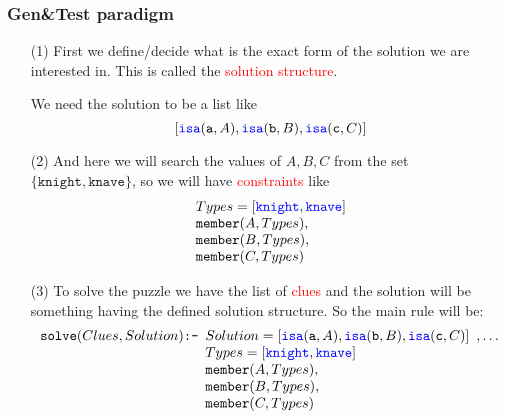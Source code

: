 \documentclass[xcolor=x11names]{beamer}
\newcommand{\cemph}[1]{\textcolor{red}{#1}}
\newcommand\ol[1]{\textcolor{blue}{\texttt{#1}}}
\newcommand{\lista}[1]{\left[#1\right]}
\newcommand{\knight}{\texttt{knight}}
\newcommand{\knave}{\texttt{knave}}
\newcommand{\member}{\texttt{member}}
\newcommand{\atom}[1]{\texttt{#1}}
\newcommand{\szabaly}[2]{#1\texttt{:-}#2}
\begin{document}
\begin{frame}
  \frametitle{Gen\&Test paradigm}
    \begin{itemize}
        \item[(1)] First we define/decide what is the exact form of the solution we are interested in. This is called the \cemph{solution structure}.

            We need the solution to be a list like
            \[ \lista{\ol{isa}(\atom a,A), \ol{isa}(\atom b,B), \ol{isa}(\atom c,C)} \]
        \item[(2)]  And here we will search the values of $A,B,C$ from the set $\{\knight, \knave\}$, so we will have \cemph{constraints} like
        \[ \begin{array}{l}
            Types = \lista{\ol{knight}, \ol{knave}}
            \\ \member(A,Types),
            \\ \member(B,Types),
            \\ \member(C,Types)
        \end{array}\]
        \item[(3)] To solve the puzzle we have the list of \cemph{clues} and the solution will be something having the defined solution structure. So the main rule will be:
        \[ \szabaly{\texttt{solve}(Clues, Solution)}{\begin{array}[t]{l}
                Solution = \lista{\ol{isa}(\atom a,A), \ol{isa}(\atom b,B), \ol{isa}(\atom c,C)}
            \\ Types = \lista{\ol{knight}, \ol{knave}}
            \\ \member(A,Types),
            \\ \member(B,Types),
            \\ \member(C,Types) \end{array}}, \dots   \]
    \end{itemize}
\end{frame}
\end{document}
